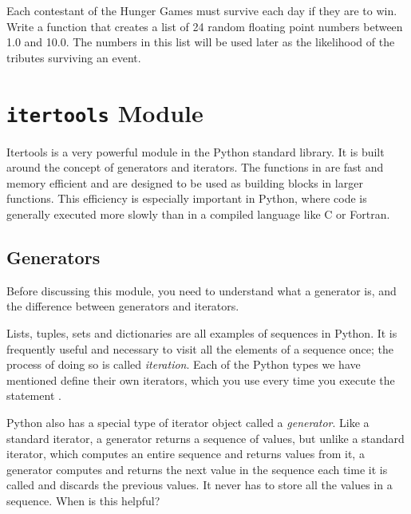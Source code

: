 \begin{problem}
Each contestant of the Hunger Games must survive each day if they are to win. Write a function that creates a list of 24 random floating point numbers between 1.0 and 10.0. The numbers in this list will be used later as the likelihood of the tributes surviving an event.
\label{prob:prob5}
\end{problem}

\section*{\texttt{itertools} Module}
Itertools is a very powerful module in the Python standard library. It is built around the concept
of generators and iterators.  The functions in  are fast and memory efficient and are designed to be used as
building blocks in larger functions. 
This efficiency is especially important in Python, where code is generally executed more slowly than in a compiled language like C or Fortran.

\subsection*{Generators}
Before discussing this module, you need to understand what a generator is, and the difference between generators and iterators.

Lists, tuples, sets and dictionaries are all examples of sequences in Python. It is frequently useful and necessary to visit all the elements of a sequence once; the process of doing so is called \emph{iteration}.
Each of the Python types we have mentioned define their own iterators, which you use every time you execute the statement .

Python also has a special type of iterator object called a \emph{generator}.
Like a standard iterator, a generator returns a sequence of values, but unlike a standard iterator, which computes an entire sequence and returns values from it, a generator computes and returns the next value in the sequence each time it is called and discards the previous values. It never has to store all the values in a sequence. When is this helpful?

